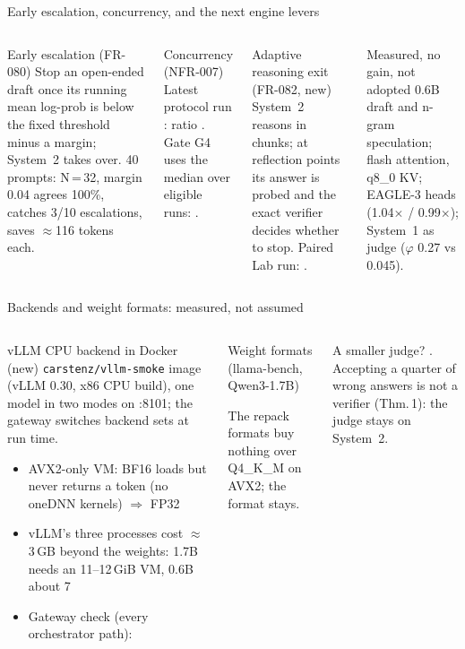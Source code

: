 \documentclass[aspectratio=169,10pt]{beamer}
\begin{document}
\begin{frame}{Early escalation, concurrency, and the next engine levers}
\begin{columns}[T]
\scriptsize
\begin{block}{Early escalation (FR-080)}
Stop an open-ended draft once its running mean log-prob is below the fixed threshold minus a margin; System~2 takes over. 40 prompts: N\,=\,32, margin 0.04 agrees 100\%, catches 3/10 escalations, saves $\approx$116 tokens each.
\end{block}
\centering\resizebox{0.92\linewidth}{!}{\EarlyEscTable}
\scriptsize
\begin{block}{Concurrency (NFR-007)}
Latest protocol run \ProtocolRun: ratio \NfrSevenRatio. Gate G4 uses the median over eligible runs: \NfrSevenPooled.
\end{block}
\begin{exampleblock}{Adaptive reasoning exit (FR-082, new)}
System~2 reasons in chunks; at reflection points its answer is probed and the exact verifier decides whether to stop. Paired Lab run: \AdaptiveExitSummary.
\end{exampleblock}
\begin{alertblock}{Measured, no gain, not adopted}
0.6B draft and n-gram speculation; flash attention, q8\_0 KV; EAGLE-3 heads (1.04$\times$ / 0.99$\times$); System~1 as judge ($\varphi$ 0.27 vs 0.045).
\end{alertblock}
\end{columns}
\end{frame}

\begin{frame}{Backends and weight formats: measured, not assumed}
\begin{columns}[T]
\scriptsize
\begin{block}{vLLM CPU backend in Docker (new)}
\texttt{carstenz/vllm-smoke} image (vLLM 0.30, x86 CPU build), one model in two modes on :8101; the gateway switches backend sets at run time.
\begin{itemize}
\item AVX2-only VM: BF16 loads but never returns a token (no oneDNN kernels) $\Rightarrow$ FP32
\item vLLM's three processes cost $\approx$3\,GB beyond the weights: 1.7B needs an 11--12\,GiB VM, 0.6B about 7
\item Gateway check (every orchestrator path): \VllmCheckSummary
\end{itemize}
\end{block}
\scriptsize
\begin{block}{Weight formats (llama-bench, Qwen3-1.7B)}
\centering\resizebox{0.7\linewidth}{!}{\QuantTable}\par
The repack formats buy nothing over Q4\_K\_M on AVX2; the format stays.
\end{block}
\begin{block}{A smaller judge?}
\JudgeCompare. Accepting a quarter of wrong answers is not a verifier (Thm.\,1): the judge stays on System~2.
\end{block}
\end{columns}
\end{frame}
\end{document}
